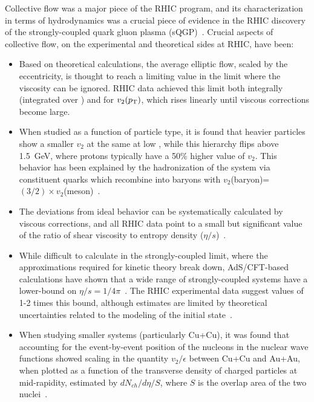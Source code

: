 Collective flow was a major piece of the RHIC program, and its characterization
in terms of hydrodynamics was a crucial piece of evidence in the RHIC discovery
of the strongly-coupled quark gluon plasma (sQGP)~\cite{Back:2004je,Adcox:2004mh,Adams:2005dq,Arsene:2004fa}.  
Crucial aspects of collective
flow, on the experimental and theoretical sides at RHIC, have been:
\begin{itemize}
\item Based on theoretical calculations, the average elliptic flow, scaled by the eccentricity,
is thought to reach a limiting value in the limit where
the viscosity can be ignored.  RHIC data achieved this limit both integrally (integrated over \pT)
and for $v_2(\mbox{$p_{\mathrm{T}}$})$, which rises linearly until viscous corrections become large.
\item When studied as a function of particle type, it is found that heavier particles show
a smaller $v_2$ at the same \pT at low \pT, while this hierarchy flips above 1.5~GeV, where protons
typically have a 50\% higher value of $v_2$.  This behavior has been explained by the hadronization of
the system via constituent quarks which recombine into baryons with $v_2$(baryon)=$(3/2) \times v_2$(meson)~\cite{Adare:2006ti,Fries:2003vb}.
\item The deviations from ideal behavior can be systematically calculated by viscous corrections, and
all RHIC data point to a small but significant value of the ratio of shear viscosity to entropy density ($\eta/s$)~\cite{Luzum:2008cw}.
\item While difficult to calculate in the strongly-coupled limit, where the approximations required for kinetic theory break down, AdS/CFT-based calculations have shown that a wide range of strongly-coupled systems have a lower-bound on
$\eta/s = 1/4\pi$~\cite{Kovtun:2004de}.  The RHIC experimental data suggest values of 1-2 times this bound, although estimates are limited
by theoretical uncertainties related to the modeling of the initial state~\cite{Luzum:2008cw}.
\item When studying smaller systems (particularly Cu+Cu), it was found that accounting for the event-by-event position of the nucleons in the nuclear wave functions showed scaling in the quantity $v_2/\epsilon$ between Cu+Cu and Au+Au, when
plotted as a function of the transverse density of charged particles at mid-rapidity, estimated by $dN_{ch}/d\eta/S$,
where $S$ is the overlap area of the two nuclei~\cite{Alver:2008zza}.
\end{itemize}

